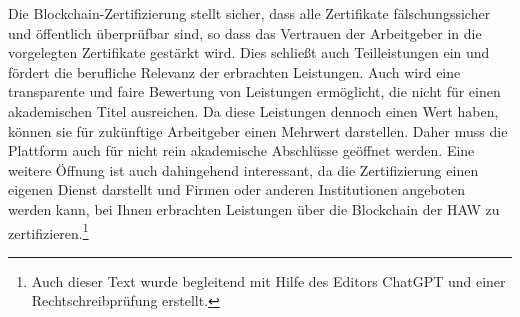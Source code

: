 \documentclass[conference]{IEEEtran}
\begin{document}
Die Blockchain-Zertifizierung stellt sicher, dass alle Zertifikate fälschungssicher und öffentlich überprüfbar sind, so dass  das Vertrauen der Arbeitgeber in die vorgelegten Zertifikate gestärkt wird. Dies schließt auch Teilleistungen ein und fördert die berufliche Relevanz der erbrachten Leistungen.
Auch wird eine transparente und faire Bewertung von Leistungen ermöglicht, die nicht für einen akademischen Titel ausreichen. Da diese Leistungen dennoch einen Wert  haben, können sie für zukünftige Arbeitgeber einen Mehrwert darstellen. Daher muss die Plattform auch für nicht rein akademische Abschlüsse geöffnet werden. Eine weitere Öffnung ist auch dahingehend interessant, da die Zertifizierung einen eigenen Dienst darstellt und Firmen oder anderen Institutionen angeboten werden kann, bei Ihnen erbrachten Leistungen über die Blockchain der HAW zu zertifizieren.\footnote{Auch dieser Text wurde begleitend mit Hilfe des Editors ChatGPT und einer Rechtschreibprüfung erstellt.}



\end{document}
